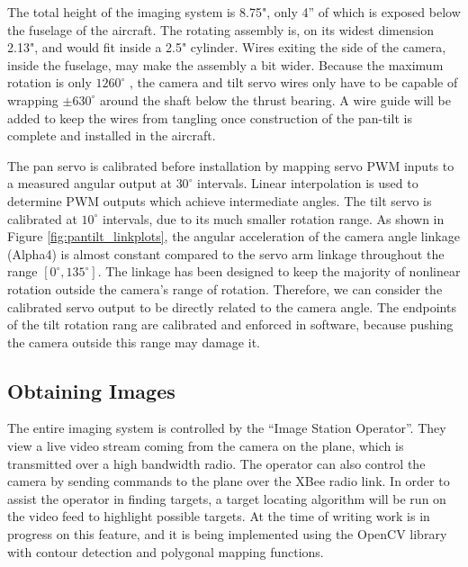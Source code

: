 \documentclass[10pt,twocolumns]{report}
\newcommand{\degrees}[1]
{
\begin{math}
#1^{\circ} 
\end{math}
}
\begin{document}
The total height of the imaging system is 8.75", only 4'' of which is exposed below the fuselage of the aircraft. The rotating assembly is, on its widest dimension 2.13", and would fit inside a 2.5" cylinder. Wires exiting the side of the camera, inside the fuselage, may make the assembly a bit wider. Because the maximum rotation is only \degrees{1260}, the camera and tilt servo wires only have to be capable of wrapping \degrees{\pm 630} around the shaft below the thrust bearing. A wire guide will be added to keep the wires from tangling once construction of the pan-tilt is complete and installed in the aircraft. 

The pan servo is calibrated before installation by mapping servo PWM inputs to a measured angular output at \degrees{30} intervals. Linear interpolation is used to determine PWM outputs which achieve intermediate angles. The tilt servo is calibrated at \degrees{10} intervals, due to its much smaller rotation range. As shown in Figure \ref{fig:pantilt_linkplots}, the angular acceleration of the camera angle linkage (Alpha4) is almost constant compared to the servo arm linkage throughout the range $[0^{\circ}, 135^{\circ}]$. The linkage has been designed to keep the majority of nonlinear rotation outside the camera's range of rotation. Therefore, we can consider the calibrated servo output to be directly related to the camera angle.
The endpoints of the tilt rotation rang are calibrated and enforced in software, because pushing the camera outside this range may damage it.

\subsection{Obtaining Images}

The entire imaging system is controlled by the ``Image Station Operator''.  They view a live video stream coming from the camera on the plane, which is transmitted over a high bandwidth radio.  The operator can also control the camera by sending commands to the plane over the XBee radio link.  In order to assist the operator in finding targets, a target locating algorithm will be run on the video feed to highlight possible targets.  At the time of writing work is in progress on this feature, and it is being implemented using the OpenCV library \cite{opencv} with contour detection and polygonal mapping functions.
\end{document}
